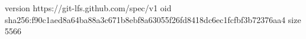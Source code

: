 version https://git-lfs.github.com/spec/v1
oid sha256:f90c1aed8a64ba88a3c671b8ebf8a63055f26fd8418dc6ec1fcfbf3b72376aa4
size 5566
